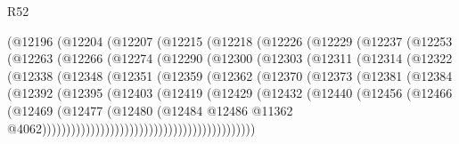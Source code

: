 \begin{lexlean}{R52}
\begin{coremodule}
            (@12196
              (@12204
                (@12207
                  (@12215
                    (@12218
                      (@12226
                        (@12229
                          (@12237
                            (@12253
                              (@12263
                                (@12266
                                  (@12274
                                    (@12290
                                      (@12300
                                        (@12303
                                          (@12311
                                            (@12314
                                              (@12322
                                                (@12338
                                                  (@12348
                                                    (@12351
                                                      (@12359
                                                        (@12362
                                                          (@12370
                                                            (@12373
                                                              (@12381
                                                                (@12384
                                                                  (@12392
                                                                    (@12395
                                                                      (@12403
                                                                        (@12419
                                                                          (@12429
                                                                            (@12432
                                                                              (@12440
                                                                                (@12456
                                                                                  (@12466
                                                                                    (@12469
                                                                                      (@12477
                                                                                        (@12480
                                                                                          (@12484
                                                                                            @12486
                                                                                            @11362
                                                                                            @4062))))))))))))))))))))))))))))))))))))))))))))

\end{coremodule}
\end{lexlean}
